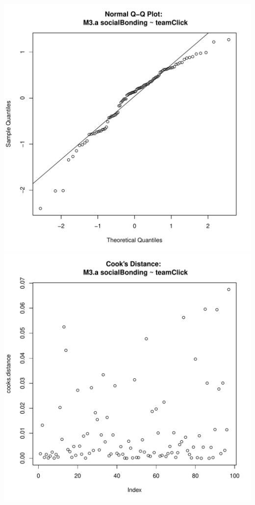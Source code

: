 \documentclass[12pt]{report}
\begin{document}
\includegraphics[scale =.4]{../images/MLM3aQQNorm.pdf}
\includegraphics[scale =.4]{../images/MLM3aCooksD.pdf}
\end{document}
